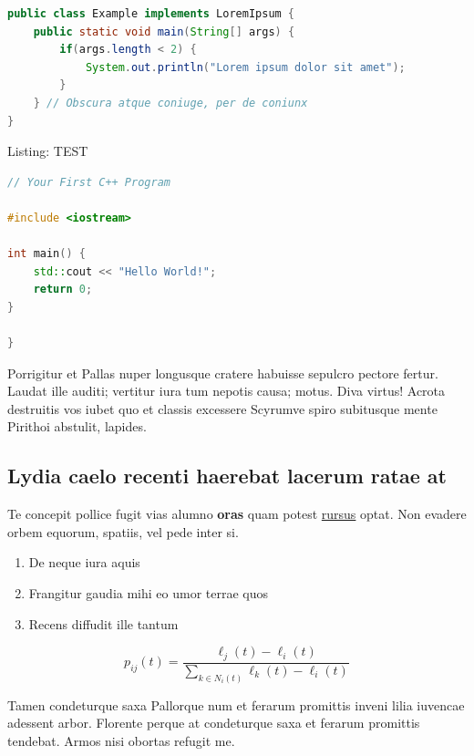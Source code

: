 \begin{lstlisting}[language=Java]
public class Example implements LoremIpsum {
    public static void main(String[] args) {
        if(args.length < 2) {
            System.out.println("Lorem ipsum dolor sit amet");
        }
    } // Obscura atque coniuge, per de coniunx
}
\end{lstlisting}

Listing: TEST

\begin{lstlisting}[language={C++}]
// Your First C++ Program

#include <iostream>

int main() {
    std::cout << "Hello World!";
    return 0;
}

}
\end{lstlisting}

Porrigitur et Pallas nuper longusque cratere habuisse sepulcro pectore
fertur. Laudat ille auditi; vertitur iura tum nepotis causa; motus. Diva
virtus! Acrota destruitis vos iubet quo et classis excessere Scyrumve
spiro subitusque mente Pirithoi abstulit, lapides.

\hypertarget{lydia-caelo-recenti-haerebat-lacerum-ratae-at}{%
\subsection{Lydia caelo recenti haerebat lacerum ratae
at}\label{lydia-caelo-recenti-haerebat-lacerum-ratae-at}}

Te concepit pollice fugit vias alumno \textbf{oras} quam potest
\href{http://example.com\#rursus}{rursus} optat. Non evadere orbem
equorum, spatiis, vel pede inter si.

\begin{enumerate}
\def\labelenumi{\arabic{enumi}.}
\tightlist
\item
  De neque iura aquis
\item
  Frangitur gaudia mihi eo umor terrae quos
\item
  Recens diffudit ille tantum
\end{enumerate}

\begin{equation}\label{eq:neighbor-propability}
    p_{ij}(t) = \frac{\ell_j(t) - \ell_i(t)}{\sum_{k \in N_i(t)}^{} \ell_k(t) - \ell_i(t)}
\end{equation}

Tamen condeturque saxa Pallorque num et ferarum promittis inveni lilia
iuvencae adessent arbor. Florente perque at condeturque saxa et ferarum
promittis tendebat. Armos nisi obortas refugit me.

